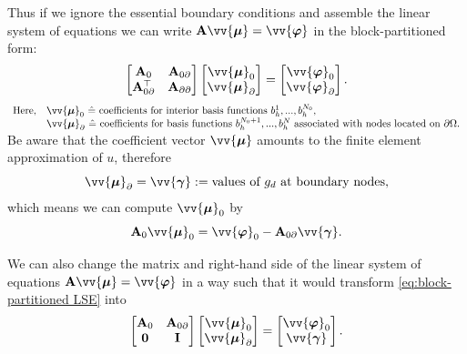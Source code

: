 	Thus if we ignore the essential boundary conditions and assemble the
	linear system of equations we can write
	$\bA\vv{\bm{\mu}}=\vv{\bm{\varphi}}$ in the block-partitioned form:
	\begin{equation}\label{eq:block-partitioned LSE}
		\begin{bmatrix}
			\bA_0 & \bA_{0\partial}\\
			\bA_{0\partial}^{\top} & \bA_{\partial\partial}
		\end{bmatrix}
		\begin{bmatrix}
			\vv{\bm{\mu}}_0 \\ \vv{\bm{\mu}}_\partial
		\end{bmatrix}=
		\begin{bmatrix}
			\vv{\bm{\varphi}}_0 \\ \vv{\bm{\varphi}}_\partial
		\end{bmatrix}.
	\end{equation}
	$\begin{array}{ll}
		\textrm{Here,} & \vv{\bm{\mu}}_0\ \hat{=}\ \textrm{coefficients 
		for interior basis functions } b_h^1,...,b_h^{N_0},\\
		&\vv{\bm{\mu}}_\partial\ \hat{=}\ \textrm{coefficients for
			basis functions } b_h^{N_0+1},...,b_h^{N} \textrm{ associated
			with nodes located on } \partial\Omega.
	\end{array}$\\[3pt]
	Be aware that the coefficient vector $\vv{\bm{\mu}}$ amounts to the 
	finite element approximation of $u$, therefore
	\begin{equation}
		\vv{\bm{\mu}}_\partial = \vv{\bm{\gamma}}:=
		\textrm{values of $g_d$ at boundary nodes},
	\end{equation}
	which means we can compute $\vv{\bm{\mu}}_0$ by 
	\begin{equation}
		\bA_0\vv{\bm{\mu}}_0=\vv{\bm{\varphi}}_0 
		-\bA_{0\partial}\vv{\bm{\gamma}}.
	\end{equation}
	
	We can also change the matrix and right-hand side of the linear system 
	of equations $\bA\vv{\bm{\mu}}=\vv{\bm{\varphi}}$ in a way such that
	it would transform \eqref{eq:block-partitioned LSE} into
	\begin{equation}\label{eq:block-partitioned LSE simplified}
		\begin{bmatrix}
			\bA_0 & \bA_{0\partial}\\
			\mathbf{0} & \mathbf{I}
		\end{bmatrix}
		\begin{bmatrix}
			\vv{\bm{\mu}}_0 \\ \vv{\bm{\mu}}_\partial
		\end{bmatrix}=
		\begin{bmatrix}
			\vv{\bm{\varphi}}_0 \\ \vv{\bm{\gamma}}
		\end{bmatrix}.
	\end{equation}

